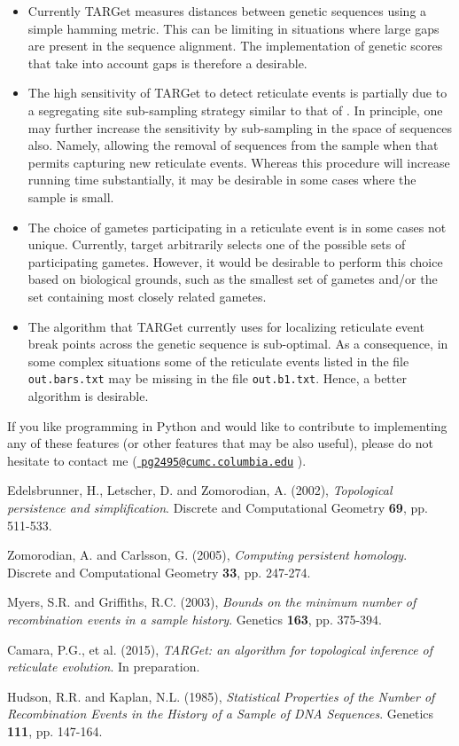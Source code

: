 \documentclass[12pt]{article}
\begin{document}
\begin{itemize}
\item Currently TARGet measures distances between genetic sequences using a simple hamming metric. This can be limiting in situations where large gaps are present in the sequence alignment. The implementation of genetic scores that take into account gaps is therefore a desirable.

\item The high sensitivity of TARGet to detect reticulate events is partially due to a segregating site sub-sampling strategy similar to that of \cite{mg}. In principle, one may further increase the sensitivity by sub-sampling in the space of sequences also. Namely, allowing the removal of sequences from the sample when that permits capturing new reticulate events. Whereas this procedure will increase running time substantially, it may be desirable in some cases where the sample is small.

\item The choice of gametes participating in a reticulate event is in some cases not unique. Currently, target arbitrarily selects one of the possible sets of participating gametes. However, it would be desirable to perform this choice based on biological grounds, such as the smallest set of gametes and/or the set containing most closely related gametes.

\item The algorithm that TARGet currently uses for localizing reticulate event break points across the genetic sequence is sub-optimal. As a consequence, in some complex situations some of the reticulate events listed in the file \texttt{out.bars.txt} may be missing in the file \texttt{out.b1.txt}. Hence, a better algorithm is desirable.
\end{itemize}
If you like programming in Python and would like to contribute to implementing any of these features (or other features that may be also useful), please do not hesitate to contact me (\href{mailto://pg2495@cumc.columbia.edu}{ \texttt{pg2495@cumc.columbia.edu}} ).


\begin{thebibliography}{99}

 Edelsbrunner, H., Letscher, D. and Zomorodian, A. (2002), \emph{Topological persistence and simplification}. Discrete and Computational Geometry {\bf 69}, pp. 511-533.

 Zomorodian, A. and Carlsson, G. (2005), \emph{Computing persistent homology}. Discrete and Computational Geometry {\bf 33}, pp. 247-274.

 Myers, S.R. and Griffiths, R.C. (2003), \emph{Bounds on the minimum number of recombination events in a sample history}. Genetics {\bf 163}, pp. 375-394.

 Camara, P.G., et al. (2015), \emph{TARGet: an algorithm for topological inference of reticulate evolution}. In preparation.

 Hudson, R.R. and Kaplan, N.L. (1985), \emph{Statistical Properties of the Number of Recombination Events in the History of a Sample of DNA Sequences}. Genetics {\bf 111}, pp. 147-164.

\end{thebibliography}
\end{document}
